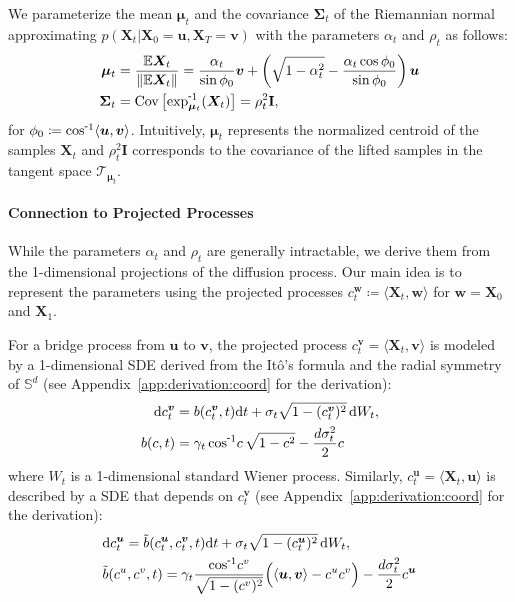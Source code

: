 We parameterize the mean $\bm{\mu}_t$ and the covariance $\bm{\Sigma}_t$ of the Riemannian normal approximating $p(\bm{X}_t|\bm{X}_0\!=\!\bm{u},\bm{X}_T\!=\!\bm{v})$ with the parameters $\alpha_t$ and $\rho_t$ as follows:
\begin{align}
   \bm{\mu}_{t}
   &= \frac{\mathbb{E}\bm{X}_{t}}{\|\mathbb{E}\bm{X}_{t}\|} 
   = \frac{\alpha_t}{\sin\phi_0}\bm{v} 
    + \left(
        \sqrt{1-\alpha_t^2} - \frac{\alpha_t\cos\phi_0}{\sin\phi_0}
    \right)\bm{u} \notag \\
    \bm{\Sigma}_t &= \text{Cov}\left[ \logmap{\bm{\mu}_t}{\bm{X}_t} \right] = \rho_{t}^2 \mathbf{I} , 
\label{eq:riemannian_normal}
\end{align}
for $\phi_0\coloneqq \invcos\langle\bm{u},\bm{v}\rangle$.
Intuitively, $\bm{\mu}_{t}$ represents the normalized centroid of the samples $\bm{X}_t$ and $\rho_{t}^2\mathbf{I}$ corresponds to the covariance of the lifted samples in the tangent space $\mathcal{T}_{\bm{\mu}_{t}}$.



\paragraph{Connection to Projected Processes}
While the parameters $\alpha_t$ and $\rho_t$ are generally intractable, we derive them from the 1-dimensional projections of the diffusion process.
Our main idea is to represent the parameters using the projected processes $c^{\bm{w}}_t \coloneqq \langle\bm{X}_t, \bm{w}\rangle$ for $\bm{w}=\bm{X}_0$ and $\bm{X}_1$.


For a bridge process from $\bm{u}$ to $\bm{v}$, the projected process $c^{\bm{v}}_t = \langle\bm{X}_t, \bm{v}\rangle$ is modeled by a 1-dimensional SDE derived from the It\^{o}'s formula and the radial symmetry of $\mathbb{S}^d$ (see Appendix~\ref{app:derivation:coord} for the derivation):
\begin{align}
\begin{split}
    \mathrm{d}c^{\bm{v}}_t &= b(c^{\bm{v}}_t, t) \mathrm{d}t + \sigma_t\sqrt{1 - (c^{\bm{v}}_t)^2}\, \mathrm{d}W_t, \\
    b(c, t) &= \gamma_t \invcos\!c \, \sqrt{1 - c^2} -\frac{d\sigma_t^2}{2}c
\end{split}
\label{eq:1d_process_end}
\end{align}
where $W_t$ is a 1-dimensional standard Wiener process. 
Similarly, $c^{\bm{u}}_t = \langle\bm{X}_t, \bm{u}\rangle$ is described by a SDE that depends on $c^{\bm{v}}_t$ (see Appendix~\ref{app:derivation:coord} for the derivation):
\begin{align}
    &\mathrm{d}c^{\bm{u}}_t = \tilde{b}(c^{\bm{u}}_t, c^{\bm{v}}_t, t)  \mathrm{d}t + \sigma_t\sqrt{1 - (c^{\bm{u}}_t)^2}\, \mathrm{d}W_t, \label{eq:1d_process_start} \\
    & \tilde{b}(c^{u}, c^{v}, t) = \gamma_t \frac{\invcos\!c^{v}}{\sqrt{1 - (c^{v})^2}} \Big( \langle\bm{u}, \bm{v}\rangle - c^{u} c^{v} \Big) -\frac{d\sigma_t^2}{2}c^{\bm{u}} \notag
\end{align}


